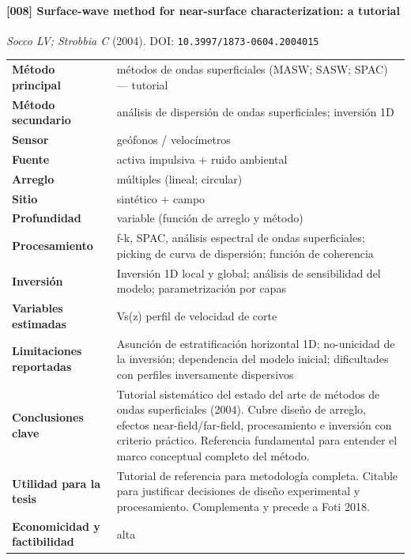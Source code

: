 \paragraph{[008] Surface-wave method for near-surface characterization: a tutorial} \emph{Socco LV; Strobbia C} (2004).
{\scriptsize DOI: \texttt{10.3997/1873-0604.2004015}}

\begin{center}\scriptsize
\begin{tabularx}{\textwidth}{@{}>{\bfseries}p{3.3cm} X@{}}
\toprule
M\'etodo principal & métodos de ondas superficiales (MASW; SASW; SPAC) --- tutorial \\
M\'etodo secundario & análisis de dispersión de ondas superficiales; inversión 1D \\
Sensor & geófonos / velocímetros \\
Fuente & activa impulsiva + ruido ambiental \\
Arreglo & múltiples (lineal; circular) \\
Sitio & sintético + campo \\
Profundidad & variable (función de arreglo y método) \\
Procesamiento & f-k, SPAC, análisis espectral de ondas superficiales; picking de curva de dispersión; función de coherencia \\
Inversi\'on & Inversión 1D local y global; análisis de sensibilidad del modelo; parametrización por capas \\
Variables estimadas & Vs(z) perfil de velocidad de corte \\
Limitaciones reportadas & Asunción de estratificación horizontal 1D; no-unicidad de la inversión; dependencia del modelo inicial; dificultades con perfiles inversamente dispersivos \\
Conclusiones clave & Tutorial sistemático del estado del arte de métodos de ondas superficiales (2004). Cubre diseño de arreglo, efectos near-field/far-field, procesamiento e inversión con criterio práctico. Referencia fundamental para entender el marco conceptual completo del método. \\
Utilidad para la tesis & Tutorial de referencia para metodología completa. Citable para justificar decisiones de diseño experimental y procesamiento. Complementa y precede a Foti 2018. \\
Economicidad y factibilidad & alta \\
\bottomrule
\end{tabularx}
\end{center}

